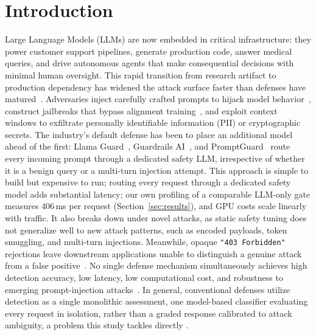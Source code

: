 \documentclass[runningheads]{llncs}
\newif\ifrev
\newcommand{\rev}[1]{\ifrev\hl{#1}\else#1\fi}                  %
\begin{document}
\section{Introduction}\label{sec:intro}

Large Language Models (LLMs) are now embedded in critical infrastructure: they power customer support pipelines, generate production code, answer medical queries, and drive autonomous agents that make consequential decisions with minimal human oversight. This rapid transition from research artifact to production dependency has widened the attack surface faster than defenses have matured~\cite{surveyprompt,owasptop10}. Adversaries inject carefully crafted prompts to hijack model behavior~\cite{greshake2023indirect}, construct jailbreaks that bypass alignment training~\cite{autodan,pair,wei2023jailbroken,zou2023universal}, and exploit context windows to exfiltrate personally identifiable information (PII) or cryptographic secrets. The industry's default defense has been to place an additional model ahead of the first: Llama Guard~\cite{llamaguard}, Guardrails AI~\cite{guardrailsai}, and PromptGuard~\cite{promptguard} route every incoming prompt through a dedicated safety LLM, irrespective of whether it is a benign query or a multi-turn injection attempt. This approach is simple to build but expensive to run; routing every request through a dedicated safety model adds substantial latency; our own profiling of a comparable LLM-only gate measures \rev{406\,ms} per request (Section~\ref{sec:results}), and GPU costs scale linearly with traffic. It also breaks down under novel attacks, as static safety tuning does not generalize well to new attack patterns, such as encoded payloads, token smuggling, and multi-turn injections. Meanwhile, opaque \texttt{"403 Forbidden"} rejections leave downstream applications unable to distinguish a genuine attack from a false positive~\cite{injecguard,capture}. No single defense mechanism simultaneously achieves high detection accuracy, low latency, low computational cost, and robustness to emerging prompt-injection attacks~\cite{maiorano2026tradeoffs}. In general, conventional defenses utilize detection as a single monolithic assessment, one model-based classifier evaluating every request in isolation, rather than a graded response calibrated to attack ambiguity, a problem this study tackles directly \cite{llamaguard,promptguard,rebuff,nemoguardrails}.
\end{document}
